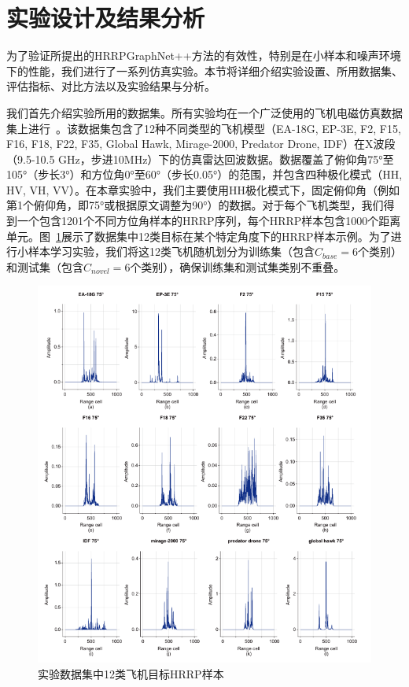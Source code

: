 \section{实验设计及结果分析}
\label{sec:experiments}

为了验证所提出的HRRPGraphNet++方法的有效性，特别是在小样本和噪声环境下的性能，我们进行了一系列仿真实验。本节将详细介绍实验设置、所用数据集、评估指标、对比方法以及实验结果与分析。

我们首先介绍实验所用的数据集。所有实验均在一个广泛使用的飞机电磁仿真数据集上进行~\cite{Chen2024, Liu2024, liu2024scnet, liu2021multi, liu2025attribute}。该数据集包含了12种不同类型的飞机模型（EA-18G, EP-3E, F2, F15, F16, F18, F22, F35, Global Hawk, Mirage-2000, Predator Drone, IDF）在X波段（9.5-10.5 GHz，步进10MHz）下的仿真雷达回波数据。数据覆盖了俯仰角75°至105°（步长3°）和方位角0°至60°（步长0.05°）的范围，并包含四种极化模式（HH, HV, VH, VV）。在本章实验中，我们主要使用HH极化模式下，固定俯仰角（例如第1个俯仰角，即75°或根据原文调整为90°）的数据。对于每个飞机类型，我们得到一个包含1201个不同方位角样本的HRRP序列，每个HRRP样本包含1000个距离单元。图~\ref{fig:dataset_chap3}展示了数据集中12类目标在某个特定角度下的HRRP样本示例。为了进行小样本学习实验，我们将这12类飞机随机划分为训练集（包含$C_{base}=6$个类别）和测试集（包含$C_{novel}=6$个类别），确保训练集和测试集类别不重叠。

\begin{figure}[h!]
    \centering
    \includegraphics[width=\linewidth]{figures/hrrp_samples.pdf} %
    \caption{实验数据集中12类飞机目标HRRP样本}
    \label{fig:dataset_chap3}
\end{figure}

